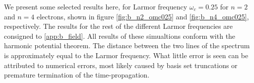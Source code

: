 We present some selected results here, for Larmor frequency $\omega_c=0.25$ for 
$n=2$ and $n=4$ electrons, shown in figure \autoref{fig:b_n2_omc025}
and \autoref{fig:b_n4_omc025}, respectively.
The results for 
the rest of the different Larmor frequencies are consigned to \autoref{app:b_field}.
All results of these simualtions conform with the harmonic potential theorem. The 
distance between the two lines of the spectrum is approximately equal to the 
Larmor frequency. What little error is seen can be attributed to numerical errors,
most likely caused by basis set truncations or premature termination of the
time-propagation.

